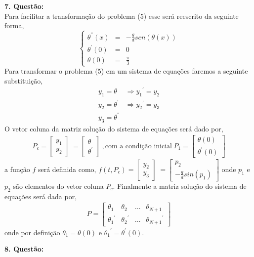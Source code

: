 \documentclass[a4paper,12pt]{article}
\begin{document}
\textbf{7. Quest\~ao:}\\
Para facilitar a transforma\c c\~ao do problema (5) esse ser\'a reescrito da seguinte forma, 
\[\left \{
	\begin{array}{ccc}
	{\theta}^{''}(x)& = & -\frac{g}{d} sen(\theta(x)) \\
	{\theta}^{'}(0) &  = & 0 \\
	{\theta}(0) &= & \frac{\pi}{3} 
\end{array}
\right .
 \]
Para transformar o problema (5) em um sistema de equa\c c\~oes faremos a seguinte substitui\c c\~ao,
\begin{align*}
	y_1 = \theta \hspace{3pt} & \Rightarrow  {y_1}^{'} = y_2\\
	y_2 = {\theta}^{'} & \Rightarrow  {y_2}^{'} = y_3 \\
	y_3 = {\theta}^{''} & 
\end{align*}
O vetor coluna da matriz solu\c c\~ao do sistema de equa\c c\~oes ser\'a dado por, 
\begin{align*}
	P_c  =  \left [ 
		\begin{array}{c}
			y_1 \\	
			{y_2}	
		\end{array}
	\right ] \hspace{3pt} =\left [ 
		\begin{array}{c}
			\theta \\	
			{\theta}^{'} 	
		\end{array}
	\right ]\hspace{3pt}, \textrm{com a condi\c c\~ao inicial} \hspace{3pt}P_1 =\left [
		\begin{array}{c}	
			\theta (0) \\
			{\theta}^{'} (0)
		\end{array} 
	\right ]   
\end{align*}
a fun\c c\~ao $f$ ser\'a definida como,
$f(t,P_c)=  \left [ 
		\begin{array}{c}
			y_2 \\	
			{y_3}	
		\end{array}
	\right ] \hspace{3pt} =\left [\begin{array}{c}
		p_2 \\
		-\frac{g}{d} sin (p_1)
	\end{array}
\right ] $ onde $p_1$ e $p_2$ s\~ao elementos do vetor coluna $P_c$.
Finalmente a matriz solu\c c\~ao do sistema de  equa\c c\~oes ser\'a dada por,
\begin{align*}
	P =\left [
		\begin{array}{cccc}
			{\theta}_1 & {\theta}_2 & \dots & {\theta}_{N+1} \\
			{{\theta}_1}^{'}& {{\theta}_2}^{'} & \dots & {{\theta}_{N+1}}^{'}
		\end{array}
	\right ] 
\end{align*}
onde por defini\c c\~ao $ {\theta}_1 = \theta (0)$ e ${{\theta}_1}^{'} = {\theta}^{'} (0)$.

\textbf{8. Quest\~ao:}\\
\end{document}
